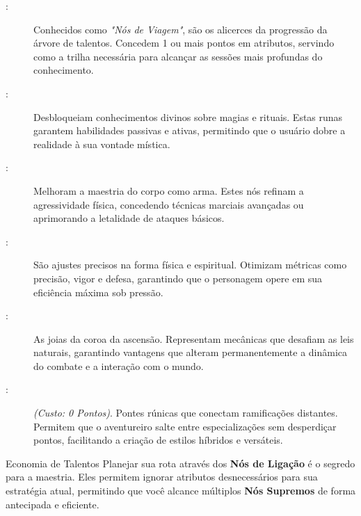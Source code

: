 \begin{description}
    \item[:] Conhecidos como \textit{"Nós de Viagem"}, são os alicerces da progressão da árvore de talentos. Concedem 1 ou mais pontos em atributos, servindo como a trilha necessária para alcançar as sessões mais profundas do conhecimento.
    
    \item[:] Desbloqueiam conhecimentos divinos sobre magias e rituais. Estas runas garantem habilidades passivas e ativas, permitindo que o usuário dobre a realidade à sua vontade mística.
    
    \item[:] Melhoram a maestria do corpo como arma. Estes nós refinam a agressividade física, concedendo técnicas marciais avançadas ou aprimorando a letalidade de ataques básicos.
    
    \item[:] São ajustes precisos na forma física e espiritual. Otimizam métricas como precisão, vigor e defesa, garantindo que o personagem opere em sua eficiência máxima sob pressão.
    
    \item[:] As joias da coroa da ascensão. Representam mecânicas que desafiam as leis naturais, garantindo vantagens que alteram permanentemente a dinâmica do combate e a interação com o mundo.
    
    \item[:] \textit{(Custo: 0 Pontos)}. Pontes rúnicas que conectam ramificações distantes. Permitem que o aventureiro salte entre especializações sem desperdiçar pontos, facilitando a criação de estilos híbridos e versáteis.
\end{description}

\begin{rpgboxtips}{Economia de Talentos}
Planejar sua rota através dos \textbf{Nós de Ligação} é o segredo para a maestria. Eles permitem ignorar atributos desnecessários para sua estratégia atual, permitindo que você alcance múltiplos \textbf{Nós Supremos} de forma antecipada e eficiente.
\end{rpgboxtips}
